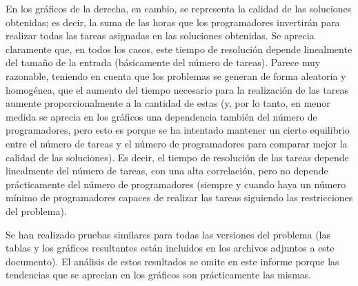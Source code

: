 En los gráficos de la derecha, en cambio, se representa la calidad de las 
soluciones obtenidas; es decir, la suma de las horas que los programadores 
invertirán para realizar todas las tareas asignadas en las soluciones 
obtenidas. Se aprecia claramente que, en todos los casos, este tiempo de 
resolución depende linealmente del tamaño de la entrada (básicamente del 
número de tareas). Parece muy razonable, teniendo en cuenta que los 
problemas se generan de forma aleatoria y homogénea, que el aumento del 
tiempo necesario para la realización de las tareas aumente proporcionalmente 
a la cantidad de estas (y, por lo tanto, en menor medida se aprecia en los 
gráficos una dependencia también del número de programadores, pero esto es 
porque se ha intentado mantener un cierto equilibrio entre el número de 
tareas y el número de programadores para comparar mejor la calidad de las 
soluciones). Es decir, el tiempo de resolución de las tareas depende 
linealmente del número de tareas, con una alta correlación, pero no depende 
prácticamente del número de programadores (siempre y cuando haya un número 
mínimo de programadores capaces de realizar las tareas siguiendo las 
restricciones del problema).

Se han realizado pruebas similares para todas las versiones del problema 
(las tablas y los gráficos resultantes están incluidos en los archivos 
adjuntos a este documento). El análisis de estos resultados se omite en este 
informe porque las tendencias que se aprecian en los gráficos son 
prácticamente las mismas.


